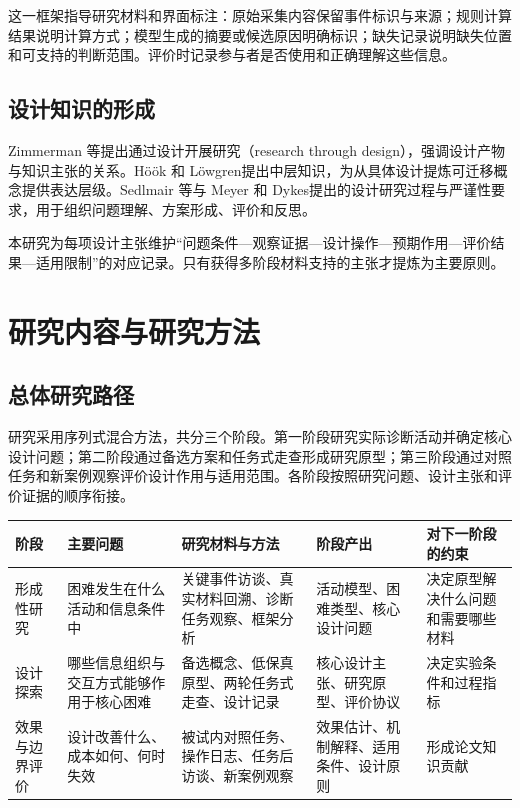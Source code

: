 这一框架指导研究材料和界面标注：原始采集内容保留事件标识与来源；规则计算结果说明计算方式；模型生成的摘要或候选原因明确标识；缺失记录说明缺失位置和可支持的判断范围。评价时记录参与者是否使用和正确理解这些信息。

\subsection{设计知识的形成}

Zimmerman 等\cite{zimmerman2007rtd}提出通过设计开展研究（research through design），强调设计产物与知识主张的关系。Höök 和 Löwgren\cite{hook2012strong}提出中层知识，为从具体设计提炼可迁移概念提供表达层级。Sedlmair 等\cite{sedlmair2012design}与 Meyer 和 Dykes\cite{meyer2020rigor}提出的设计研究过程与严谨性要求，用于组织问题理解、方案形成、评价和反思。

本研究为每项设计主张维护“问题条件—观察证据—设计操作—预期作用—评价结果—适用限制”的对应记录。只有获得多阶段材料支持的主张才提炼为主要原则。

\section{研究内容与研究方法}

\subsection{总体研究路径}

研究采用序列式混合方法，共分三个阶段。第一阶段研究实际诊断活动并确定核心设计问题；第二阶段通过备选方案和任务式走查形成研究原型；第三阶段通过对照任务和新案例观察评价设计作用与适用范围。各阶段按照研究问题、设计主张和评价证据的顺序衔接。

\begin{table}[H]
  \centering
  \small
  \begin{tabularx}{\textwidth}{Y Y Y Y Y}
    \toprule
    阶段 & 主要问题 & 研究材料与方法 & 阶段产出 & 对下一阶段的约束 \\
    \midrule
    形成性研究 & 困难发生在什么活动和信息条件中 & 关键事件访谈、真实材料回溯、诊断任务观察、框架分析 & 活动模型、困难类型、核心设计问题 & 决定原型解决什么问题和需要哪些材料 \\
    设计探索 & 哪些信息组织与交互方式能够作用于核心困难 & 备选概念、低保真原型、两轮任务式走查、设计记录 & 核心设计主张、研究原型、评价协议 & 决定实验条件和过程指标 \\
    效果与边界评价 & 设计改善什么、成本如何、何时失效 & 被试内对照任务、操作日志、任务后访谈、新案例观察 & 效果估计、机制解释、适用条件、设计原则 & 形成论文知识贡献 \\
    \bottomrule
  \end{tabularx}
\end{table}

